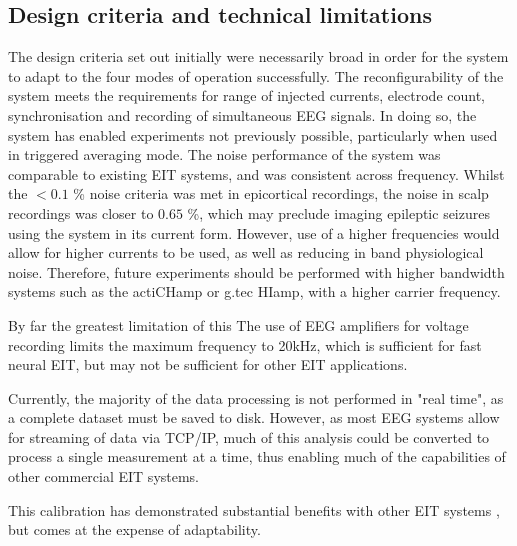 \subsection{Design criteria and technical limitations}
The design criteria set out initially were necessarily broad in order for the system to adapt to the four modes of operation successfully. The reconfigurability of the system meets the requirements for range of injected currents, electrode count, synchronisation and recording of simultaneous EEG signals. In doing so, the system has enabled experiments not previously possible, particularly when used in triggered averaging mode. The noise performance of the system was comparable to existing EIT systems, and was consistent across frequency. Whilst the  $<0.1$ \% noise criteria was met in epicortical recordings, the noise in scalp recordings was closer to $0.65$ \%, which may preclude imaging epileptic seizures using the system in its current form. However, use of a higher frequencies would allow for higher currents to be used, as well as reducing in band physiological noise. Therefore, future experiments should be performed with higher bandwidth systems such as the actiCHamp or g.tec HIamp, with a higher carrier frequency. 

By far the greatest limitation of this 
The use of EEG amplifiers for voltage recording limits the maximum frequency to 20kHz, which is sufficient for fast neural EIT, but may not be sufficient for other EIT applications. 

Currently, the majority of the data processing is not performed in "real time", as a complete dataset must be saved to disk. However, as most EEG systems allow for streaming of data via TCP/IP, much of this analysis could be converted to process a single measurement at a time, thus enabling much of the capabilities of other commercial EIT systems.

This calibration has demonstrated substantial benefits with other EIT systems \cite{Hun_Wi_2014} \cite{khan}, but comes at the expense of adaptability.